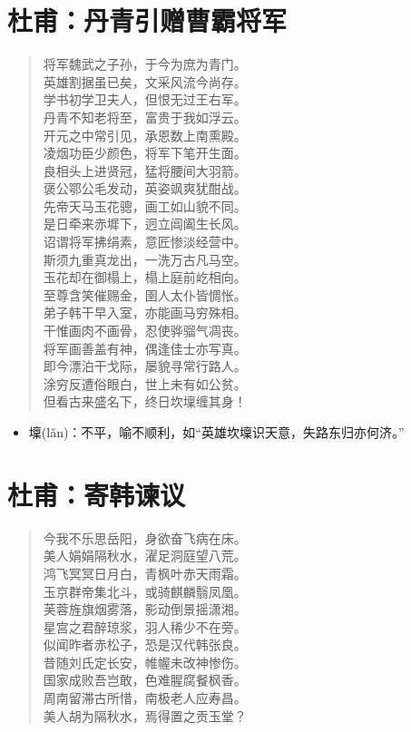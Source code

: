 \documentclass[12pt,oneside]{book}
\newenvironment{shici}{%
\begin{verse}\centering\yanti\large\hspace{12pt}}{\end{verse}}
\begin{document}
\begin{common-format}
\chapter{杜甫：丹青引赠曹霸将军}
\begin{shici}
将军魏武之子孙，于今为庶为青门。\\
英雄割据虽已矣，文采风流今尚存。\\
学书初学卫夫人，但恨无过王右军。\\
丹青不知老将至，富贵于我如浮云。\\
开元之中常引见，承恩数上南熏殿。\\
凌烟功臣少颜色，将军下笔开生面。\\
良相头上进贤冠，猛将腰间大羽箭。\\
褒公鄂公毛发动，英姿飒爽犹酣战。\\
先帝天马玉花骢，画工如山貌不同。\\
是日牵来赤墀下，迥立阊阖生长风。\\
诏谓将军拂绢素，意匠惨淡经营中。\\
斯须九重真龙出，一洗万古凡马空。\\
玉花却在御榻上，榻上庭前屹相向。\\
至尊含笑催赐金，圉人太仆皆惆怅。\\
弟子韩干早入室，亦能画马穷殊相。\\
干惟画肉不画骨，忍使骅骝气凋丧。\\
将军画善盖有神，偶逢佳士亦写真。\\
即今漂泊干戈际，屡貌寻常行路人。\\
涂穷反遭俗眼白，世上未有如公贫。\\
但看古来盛名下，终日坎壈缠其身！
\end{shici}

\begin{itemize}
\item 壈(lǎn)：不平，喻不顺利，如“英雄坎壈识天意，失路东归亦何济。”
\end{itemize}

\chapter{杜甫：寄韩谏议}
\begin{shici}
今我不乐思岳阳，身欲奋飞病在床。\\
美人娟娟隔秋水，濯足洞庭望八荒。\\
鸿飞冥冥日月白，青枫叶赤天雨霜。\\
玉京群帝集北斗，或骑麒麟翳凤凰。\\
芙蓉旌旗烟雾落，影动倒景摇潇湘。\\
星宫之君醉琼浆，羽人稀少不在旁。\\
似闻昨者赤松子，恐是汉代韩张良。\\
昔随刘氏定长安，帷幄未改神惨伤。\\
国家成败吾岂敢，色难腥腐餐枫香。\\
周南留滞古所惜，南极老人应寿昌。\\
美人胡为隔秋水，焉得置之贡玉堂？
\end{shici}


\end{common-format}
\end{document}
